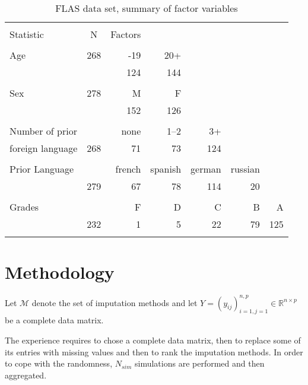 \begin{table}[ht]
  \caption{FLAS data set, summary of factor variables}
  \label{tbl:flas:factor}
  \centering
\begin{tabular}{lrrrrrr}
\\[-1.8ex]\hline
\hline \\[-1.8ex]
Statistic & \multicolumn{1}{c}{N}  & Factors  &  &  &  &  \\
\hline \\[-1.8ex]
  Age  & 268 & -19 & 20+ & & \\
       & & 124 & 144  & & \\
\vspace{-5pt} \\

  Sex  & 278 & M & F & &  \\
       &     & 152 & 126 & &   \\
\vspace{-5pt} \\

  Number of prior & &  none & 1--2 & 3+ & & \\
  foreign language & 268  &  71 &  73 & 124 & &  \\
\vspace{-5pt} \\

  Prior Language & & french & spanish & german & russian & \\
       & 279 &  67 &  78 & 114 &  20 & \\
  \vspace{-5pt} \\

  Grades & & F & D & C  & B  & A \\
         & 232 & 1 & 5 & 22 & 79 & 125 \\
\hline \\[-1.8ex]
\end{tabular}
\end{table}



\section{Methodology}

Let $\mathcal{M}$ denote the set of imputation methods and let
$Y = (y_{ij})_{i=1,j=1}^{n,p} \in \mathbb{R}^{n\times p}$ be a complete data matrix.

The experience requires to chose a complete data matrix, then to replace some
of its entries with missing values and then to rank the imputation
methods. In order to cope with the randomness, $N_{sim}$ simulations are
performed and then aggregated.

